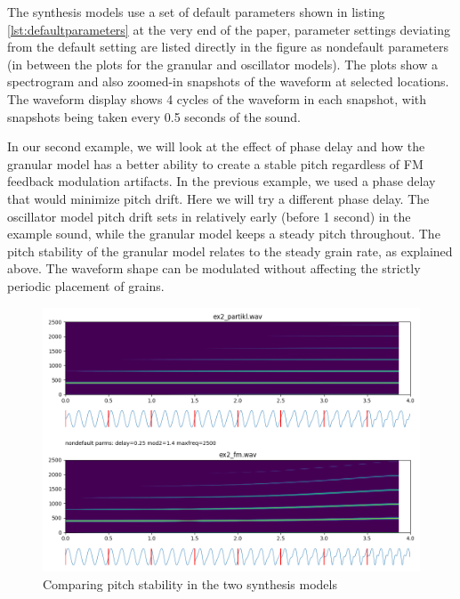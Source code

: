 \documentclass[runningheads,a4paper]{llncs}
\begin{document}
The synthesis models use a set of default parameters shown in listing \ref{lst:defaultparameters} at the very end of the paper, parameter settings deviating from the default setting are listed directly in the figure as nondefault parameters (in between the plots for the granular and oscillator models). The plots show a spectrogram and also zoomed-in snapshots of the waveform at selected locations. The waveform display shows 4 cycles of the waveform in each snapshot, with snapshots being taken every 0.5 seconds of the sound.

In our second example, we will look at the effect of phase delay and how the granular model has a better ability to create a stable pitch regardless of FM feedback modulation artifacts. In the previous example, we used a phase delay that would minimize pitch drift. Here we will try a different phase delay. The oscillator model pitch drift sets in relatively early (before 1 second) in the example sound, while the granular model keeps a steady pitch throughout. The pitch stability of the granular model relates to the steady grain rate, as explained above. The waveform shape can be modulated without affecting the strictly periodic placement of grains. 

\begin{figure}[h]
	\centering
	\includegraphics[width=.95\textwidth]{ex2_compare.png}
	\caption{Comparing pitch stability in the two synthesis models}
	\label{fig:ex2}
\end{figure}
\end{document}
